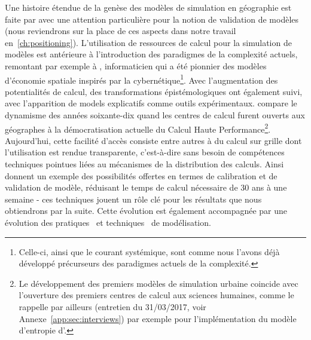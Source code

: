 {Une histoire étendue de la genèse des modèles de simulation en géographie est faite par \cite{rey2015plateforme} avec une attention particulière pour la notion de validation de modèles (nous reviendrons sur la place de ces aspects dans notre travail en~\ref{ch:positioning}). L'utilisation de ressources de calcul pour la simulation de modèles est antérieure à l'introduction des paradigmes de la complexité actuels, remontant par exemple à , informaticien qui a été pionnier des modèles d'économie spatiale inspirés par la cybernétique\footnote{Celle-ci, ainsi que le courant systémique, sont comme nous l'avons déjà développé précurseurs des paradigmes actuels de la complexité.}. Avec l'augmentation des potentialités de calcul, des transformations épistémologiques ont également suivi, avec l'apparition de models explicatifs comme outils expérimentaux.  compare le dynamisme des années soixante-dix quand les centres de calcul furent ouverts aux géographes à la démocratisation actuelle du Calcul Haute Performance\footnote{Le développement des premiers modèles de simulation urbaine coincide avec l'ouverture des premiers centres de calcul aux sciences humaines, comme le rappelle par ailleurs  (entretien du 31/03/2017, voir Annexe~\ref{app:sec:interviews}) par exemple pour l'implémentation du modèle d'entropie d'.}. Aujourd'hui, cette facilité d'accès consiste entre autres à du calcul sur grille dont l'utilisation est rendue transparente, c'est-à-dire sans besoin de compétences techniques pointues liées au mécanismes de la distribution des calculs. Ainsi~\cite{schmitt2014half} donnent un exemple des possibilités offertes en termes de calibration et de validation de modèle, réduisant le temps de calcul nécessaire de 30 ans à une semaine - ces techniques jouent un rôle clé pour les résultats que nous obtiendrons par la suite. Cette évolution est également accompagnée par une évolution des pratiques~\cite{banos2013pour} et techniques~\cite{10.1371/journal.pone.0138212} de modélisation.
}


